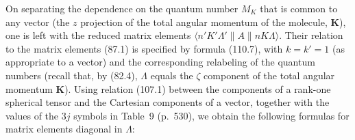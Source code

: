 On separating the dependence on the quantum number $M_K$ that is common to any vector (the $z$ projection of the total angular momentum
of the molecule, $\mathbf K$), one is left with the reduced matrix elements $\langle n'K'\Lambda'\|A\|nK\Lambda\rangle$.
Their relation to the matrix elements (87.1) is specified by formula (110.7), with $k=k'=1$ (as appropriate to a vector) and the corresponding relabeling of the quantum numbers (recall that, by (82.4), $\Lambda$ equals the $\zeta$ component of the total angular momentum $\mathbf K$).
Using relation (107.1) between the components of a rank-one spherical tensor and the Cartesian components of a vector, together with the values of the $3j$ symbols in Table~9 (p.~530), we obtain the following formulas for matrix elements diagonal in $\Lambda$:
